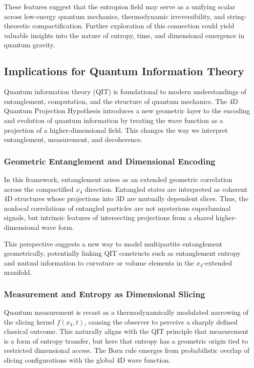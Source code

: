 \documentclass[12pt]{article}
\begin{document}
These features suggest that the entropion field may serve as a unifying scalar across low-energy quantum mechanics, thermodynamic irreversibility, and string-theoretic compactification. Further exploration of this connection could yield valuable insights into the nature of entropy, time, and dimensional emergence in quantum gravity.


\subsection{Implications for Quantum Information Theory}

Quantum information theory (QIT) is foundational to modern understandings of entanglement, computation, and the structure of quantum mechanics. The 4D Quantum Projection Hypothesis introduces a new geometric layer to the encoding and evolution of quantum information by treating the wave function as a projection of a higher-dimensional field. This changes the way we interpret entanglement, measurement, and decoherence.

\subsubsection*{Geometric Entanglement and Dimensional Encoding}

In this framework, entanglement arises as an extended geometric correlation across the compactified $x_4$ direction. Entangled states are interpreted as coherent 4D structures whose projections into 3D are mutually dependent slices. Thus, the nonlocal correlations of entangled particles are not mysterious superluminal signals, but intrinsic features of intersecting projections from a shared higher-dimensional wave form.

This perspective suggests a new way to model multipartite entanglement geometrically, potentially linking QIT constructs such as entanglement entropy and mutual information to curvature or volume elements in the $x_4$-extended manifold.

\subsubsection*{Measurement and Entropy as Dimensional Slicing}

Quantum measurement is recast as a thermodynamically modulated narrowing of the slicing kernel $f(x_4,t)$, causing the observer to perceive a sharply defined classical outcome. This naturally aligns with the QIT principle that measurement is a form of entropy transfer, but here that entropy has a geometric origin tied to restricted dimensional access. The Born rule emerges from probabilistic overlap of slicing configurations with the global 4D wave function.
\end{document}
